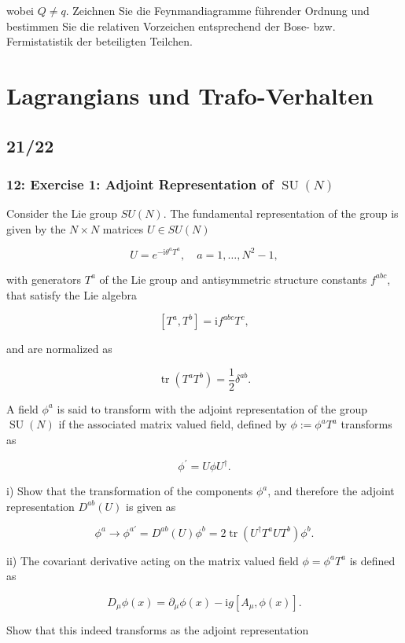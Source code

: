 \documentclass[10pt, letterpaper]{article}
\begin{document}
wobei $Q \neq q$. Zeichnen Sie die Feynmandiagramme führender Ordnung und bestimmen Sie die relativen Vorzeichen entsprechend der Bose- bzw. Fermistatistik der beteiligten Teilchen.


\pagebreak


\section{Lagrangians und Trafo-Verhalten}


\subsection{21/22}


\subsubsection{12: Exercise 1: Adjoint Representation of $\operatorname{SU}(N)$}
Consider the Lie group $S U(N)$. The fundamental representation of the group is given by the $N \times N$ matrices $U \in S U(N)$

$$
U=e^{-\mathrm{i} \theta^a T^a}, \quad a=1, \ldots, N^2-1,
$$

with generators $T^a$ of the Lie group and antisymmetric structure constants $f^{a b c}$, that satisfy the Lie algebra

$$
\left[T^a, T^b\right]=\mathrm{i} f^{a b c} T^c,
$$

and are normalized as

$$
\operatorname{tr}\left(T^a T^b\right)=\frac{1}{2} \delta^{a b} .
$$


A field $\phi^a$ is said to transform with the adjoint representation of the group $\operatorname{SU}(N)$ if the associated matrix valued field, defined by $\phi:=\phi^a T^a$ transforms as

$$
\phi^{\prime}=U \phi U^{\dagger} .
$$

i) Show that the transformation of the components $\phi^a$, and therefore the adjoint representation $D^{a b}(U)$ is given as

$$
\phi^a \rightarrow \phi^{a \prime}=D^{a b}(U) \phi^b=2 \operatorname{tr}\left(U^{\dagger} T^a U T^b\right) \phi^b .
$$

ii) The covariant derivative acting on the matrix valued field $\phi=\phi^a T^a$ is defined as

$$
D_\mu \phi(x)=\partial_\mu \phi(x)-\mathrm{i} g\left[A_\mu, \phi(x)\right] .
$$


Show that this indeed transforms as the adjoint representation
\end{document}
